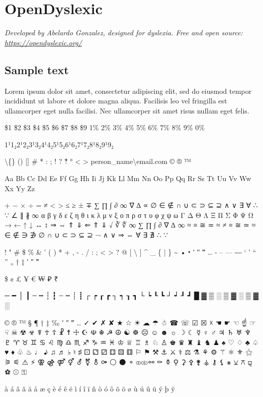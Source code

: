 \section{OpenDyslexic}
\emph{Developed by Abelardo Gonzalez, designed for dyslexia. Free and open source: \url{https://opendyslexic.org/}}
\begin{raggedright}
\section*{Sample text}
Lorem ipsum dolor sit amet, consectetur adipiscing elit, sed do eiusmod tempor incididunt ut labore et dolore magna aliqua. Facilisis leo vel fringilla est ullamcorper eget nulla facilisi. Nec ullamcorper sit amet risus nullam eget felis.

\$1 \$2 \$3 \$4 \$5 \$6 \$7 \$8 \$9 1\% 2\% 3\% 4\% 5\% 6\% 7\% 8\% 9\% 0\%

1¹1₂2¹2₂3¹3₂4¹4₂5¹5₂6¹6₂7¹7₂8¹8₂9¹9₂

\textbackslash\{\} () [] \# * : ; ! ? ‽ ° \textless{} \textgreater{} person\_name\textbackslash{}email.com © ® ™

Aa Bb Cc Dd Ee Ff Gg Hh Ii Jj Kk Ll Mm Nn Oo Pp Qq Rr Ss Tt Uu Vv Ww Xx Yy Zz

+ − × ÷ = ≠ < > ≤ ≥ ± ∓
∑ ∏ ∫ ∂ ∞ ∇ ∆ ∝ ∅ ∈ ∉ ∩ ∪ ⊂ ⊃ ⊆ ⊇ ∧ ∨ ∃ ∀ ∴ ∵ ∠ ∥ ∦ ∞
α β γ δ ε ζ η θ ι κ λ μ ν ξ ο π ρ σ τ υ φ χ ψ ω
Γ Δ Θ Λ Ξ Π Σ Φ Ψ Ω
→ ← ↑ ↓ ↔ ↕ ⇒ ⇔ ⇑ ⇓ ⇐ ⇑ ⇓
√ ∛ ∜ ∞ ∑ ∏ ∫ ∂ ∇ ∆ ∞ ≈ ≡ ≅ ≃ ≈ ≠ ≡ ≅ ≃ ≈
∈ ∉ ∋ ∌ ∅ ∩ ∪ ⊂ ⊃ ⊆ ⊇
¬ ∧ ∨ ⇒ ⇔ ∀ ∃ ∄ ∴ ∵

! " \# \$ \% \& ' ( ) * + , - . / : ; \textless{} \textgreater{} ? @ [ \textbackslash{} ] \^{} \_ \{ | \} \~{}
• ‣ ′ ″ ‴ … ‐ – — ― ‘ ’ “ ” „ † ‡ ′ ″ ‴

\$ ¢ £ ¥ € ₩ ₽ ₹

─ ━ │ ┃ ┄ ┅ ┆ ┇ ┈ ┉ ┊ ┋ ┌ ┍ ┎ ┏ ┐ ┑ ┒ ┓ └ ┕ ┖ ┗ ┘ ┙ ┚ ┛
█ ▓ ▒ ░ ▒ ▓ ░ ▒ ▓ ░

© ® ™ § ¶ † ‡ ‰ ′ ″ ‴ … ✓ ✔ ✗ ✘ ★ ☆ ☀ ☁ ☂ ☃ ☎ ☏ ☑ ☒ ☓ ☚ ☛ ☜ ☝ ☞ ☟ ☠ ☢ ☣ ☤ ☥ ☦ ☧ ☨ ☩ ☪ ☫ ☬ ☭ ☮ ☯ ☸ ☹ ☺ ☻ ☼ ☽ ☾ ☿ ♀ ♂ ♃ ♄ ♅ ♆ ♇ ♈ ♉ ♊ ♋ ♌ ♍ ♎ ♏ ♐ ♑ ♒ ♓ ♔ ♕ ♖ ♗ ♘ ♙ ♚ ♛ ♜ ♝ ♞ ♟ ♠ ♡ ♢ ♣ ♤ ♥ ♦ ♧ ♨ ♩ ♪ ♫ ♬ ♭ ♮ ♯ ⚀ ⚁ ⚂ ⚃ ⚄ ⚅ ⚐ ⚑ ⚒ ⚓ ⚔ ⚕ ⚖ ⚗ ⚘ ⚙ ⚚ ⚛ ⚜ ⚝ ⚞ ⚟ ⚠ ⚡ ⚢ ⚣ ⚤ ⚥ ⚦ ⚧ ⚨ ⚩ ⚪ ⚫ ⚬ ⚭ ⚮ ⚯ ⚰ ⚱ ⚲ ⚳ ⚴ ⚵ ⚶ ⚷ ⚸ ⚹ ⚺ ⚻ ⚼ ⚽ ⚾ ⚿

à á â ã ä å æ ç è é ê ë ì í î ï ñ ò ó ô õ ö ø ù ú û ü ý þ ÿ
\end{raggedright}

